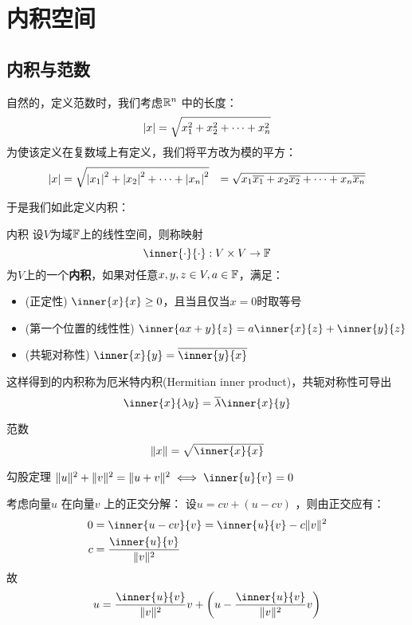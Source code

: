 \chapter{内积空间}
\section{内积与范数}

自然的，定义范数时，我们考虑\(\mathbb{R}^{n} \) 中的长度：\[
    \left|x\right| = \sqrt{x_1^2 + x_2^2 + \cdots + x_n^2}
\]
为使该定义在复数域上有定义，我们将平方改为模的平方：
\begin{align*}
    \left|x\right| &= \sqrt{\left|x_1\right|^2 + \left|x_2\right|^2 + \cdots + \left|x_n\right|^2}
    &= \sqrt{x_1 \overline{x_1} + x_2 \overline{x_2} + \cdots + x_n
    \overline{x_n}}
\end{align*}

于是我们如此定义内积：
\begin{definition}{内积}
    设\(V\)为域\(\mathbb{F}\)上的线性空间，则称映射
    \[
        \inner{\cdot}{\cdot} : V \times V \to \F
    \]
    为\(V\)上的一个\textbf{内积}，如果对任意\(x,y,z \in V, a \in \mathbb{F}\)，满足：
    \begin{itemize}
        \item (正定性) \(\inner{x}{x} \geq 0\)，且当且仅当\(x = 0\)时取等号
        \item (第一个位置的线性性) \(\inner{ax + y}{z} = a\inner{x}{z} + \inner{y}{z}\)
        \item (共轭对称性) \(\inner{x}{y} = \conj{\inner{y}{x}}\)
    \end{itemize}
\end{definition}

这样得到的内积称为厄米特内积(Hermitian inner product)，共轭对称性可导出\[
    \inner{x}{\lambda y} = \conj{\lambda} \inner{x}{y}
\]

\begin{definition}{范数}
    \[
        \norm{x} = \sqrt{\inner{x}{x}}
    \]
\end{definition}

\begin{theorem}{勾股定理}
    \(\norm{u}^{2} + \norm{v}^{2} = \norm{u+v}^{2} \iff \inner{u}{v} = 0\)
\end{theorem}

考虑向量\(u\) 在向量\(v\) 上的正交分解：
设\(u = cv + (u-cv)\) ，则由正交应有：
\begin{align*}
    0 &= \inner{u-cv}{v} = \inner{u}{v} - c\norm{v}^{2} \\
    c &= \frac{\inner{u}{v}}{\norm{v}^{2}}
\end{align*}
故\[
    u = \frac{\inner{u}{v}}{\norm{v}^{2}} v + \left(u -
    \frac{\inner{u}{v}}{\norm{v}^{2}} v\right)
\]

